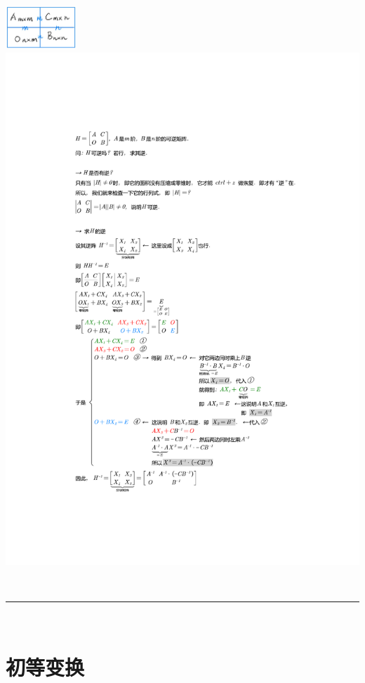 \documentclass[UTF8]{ctexart}
\begin{document}
\begin{myEnvSample}	
\includegraphics[width=0.2\textwidth]{img/0033.png}\\

\includegraphics[width=1\textwidth]{img/0032.pdf}
\end{myEnvSample}


~\\
\hrule
~\\

\section{初等变换}
\end{document}
